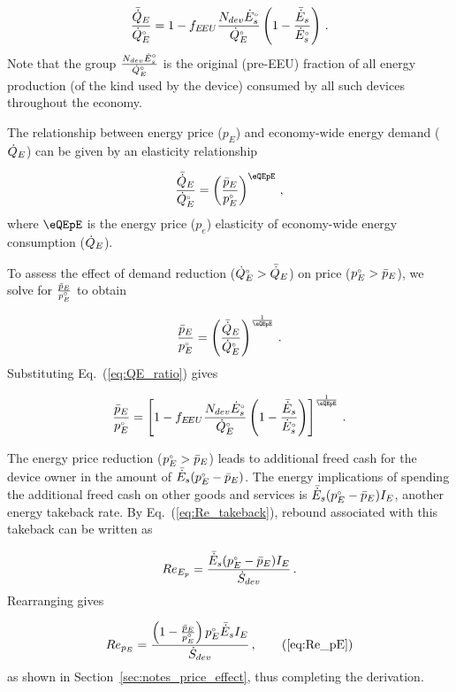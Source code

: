 \begin{equation} \label{eq:QE_ratio}
  \frac{\bar{\dot{Q}}_E}{{}{\dot{Q}}^{\scriptscriptstyle \circ}_E} =
        1 - f_{E\!EU} \frac{N_{dev} {}{\dot{E}}^{\scriptscriptstyle \circ}_s}{{}{\dot{Q}}^{\scriptscriptstyle \circ}_E} \left( 1 - \frac{\bar{\dot{E}}_s}{{}{\dot{E}}^{\scriptscriptstyle \circ}_s}  \right) \, .
\end{equation}
%
Note that the group $\frac{N_{dev} {}{\dot{E}}^{\scriptscriptstyle \circ}_s}{{}{\dot{Q}}^{\scriptscriptstyle \circ}_E}$
is the original (pre-EEU) fraction of all energy production
(of the kind used by the device)
consumed by all such devices throughout the economy.

The relationship between energy price ($p_E$) and 
economy-wide energy demand ($\dot{Q}_E$) 
can be given by an elasticity relationship

\begin{equation}
  \frac{\rainc{Q}_E}{\rorig{Q}_E} =
        \left( \frac{\ainc{p}_E}{\orig{p}_E} \right) ^ {\eQEpE} \, ,
\end{equation}
%
where $\eQEpE$ is the energy price ($p_e$) elasticity 
of economy-wide energy consumption ($\dot{Q}_E$).

To assess the effect of demand reduction 
(${}{\dot{Q}}^{\scriptscriptstyle \circ}_E > \bar{\dot{Q}}_E$)
on price
(${}{p}^{\scriptscriptstyle \circ}_E > \bar{p}_E$),
we solve for $\frac{\bar{p}_E}{{}{p}^{\scriptscriptstyle \circ}_E}$ 
to obtain

\begin{equation}
  \frac{\ainc{p}_E}{\orig{p}_E} = 
        \left( \frac{\rainc{Q}_E}{\rorig{Q}_E} \right)  ^ {\frac{1}{\eQEpE}} \, .
\end{equation}
%
Substituting Eq.~(\ref{eq:QE_ratio}) gives

\begin{equation}
  \frac{\ainc{p}_E}{\orig{p}_E} = 
        \left[ 1 - f_{\EEU} \frac{N_{dev} \rbempl{E}_s}{\rbempl{Q}_E} \left( 1 - \frac{\rainc{E}_s}{\rbempl{E}_s}  \right) \right]  ^ {\frac{1}{\eQEpE}} \, .
\end{equation}

The energy price reduction (${}{p}^{\scriptscriptstyle \circ}_E > \bar{p}_E$)
leads to additional freed cash for the device owner in the amount of
$\bar{\dot{E}}_s ({}{p}^{\scriptscriptstyle \circ}_E - \bar{p}_E)$.
The energy implications of spending the additional freed cash
on other goods and services is
$\bar{\dot{E}}_s ({}{p}^{\scriptscriptstyle \circ}_E - \bar{p}_E) I_E$, 
another energy takeback rate.
By Eq.~(\ref{eq:Re_takeback}), 
rebound associated with this takeback 
can be written as

\begin{equation}
  Re_{E_p} = \frac{\bar{\dot{E}}_s ({}{p}^{\scriptscriptstyle \circ}_E - \bar{p}_E) I_E}{\dot{S}_{dev}} \, .
\end{equation}
%
Rearranging gives

\begin{equation}
  Re_{p_E} = \frac{\left(1 - \frac{\ainc{p}_E}{\bempl{p}_E}\right) \orig{p}_E \rainc{E}_s I_E}{\Sdot} \, ,  \tag{\ref{eq:Re_pE}}
\end{equation}
%
as shown in Section~\ref{sec:notes_price_effect}, 
thus completing the derivation.



